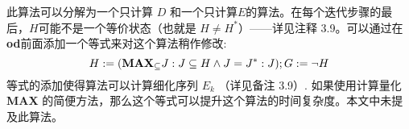 此算法可以分解为一个只计算 $D$ 和一个只计算$E$的算法。在每个迭代步骤的最后，$H$可能不是一个等价状态（也就是 $ H \not= H^* $）——详见注释 3.9。可以通过在\textbf{od}前面添加一个等式来对这个算法稍作修改:
$$ H := (\mbox{\textbf{MAX}}_{\subseteq } J : J \subseteq H \land J = J ^* : J); G := \neg H $$
等式的添加使得算法可以计算细化序列 $E_k$ （详见备注 3.9）. 如果使用计算量化 \textbf{MAX} 的简便方法，那么这个等式可以提升这个算法的时间复杂度。本文中未提及此算法。

